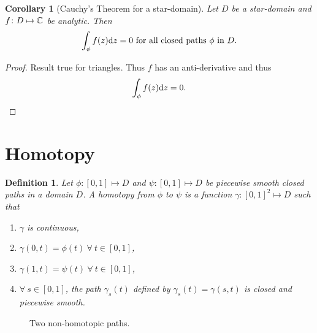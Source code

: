 \documentclass{notes}
\theoremstyle{plain}
\newtheorem{corollary}[proposition]{Corollary}
\newtheorem{definition}[proposition]{Definition}
\begin{document}
\begin{corollary}[Cauchy's Theorem for a star-domain]%
Let $D$ be a star-domain and $f \colon D \mapsto \mathbb{C}$ be analytic.  Then
\[
\int_\phi f(z) \mathrm{d} z = 0 \text{ for all closed paths $\phi$ in $D$.}
\]
\end{corollary}

\begin{proof}
Result true for triangles.  Thus $f$ has an anti-derivative and thus
\[
\int_\phi f(z) \mathrm{d} z = 0.
\]
\end{proof}

\section{Homotopy}

\begin{definition}
Let $\phi \colon [0,1] \mapsto D$ and $\psi \colon [0,1] \mapsto D$ be piecewise smooth
closed paths in a domain $D$.  A homotopy from $\phi$ to
$\psi$ is a function $\gamma \colon [0,1]^2 \mapsto D$ such that
\begin{enumerate}
\item $\gamma$ is continuous,
\item $\gamma(0,t) = \phi(t)\ \forall\ t \in [0,1]$,
\item $\gamma(1,t) = \psi(t)\ \forall\ t \in [0,1]$,
\item $\forall\ s \in [0,1]$, the path $\gamma_s(t)$ defined by $\gamma_s(t)
= \gamma(s,t)$ is closed and piecewise smooth.
\end{enumerate}
\end{definition}

\begin{figure}[h]
\begin{center}
\end{center}
\caption{Two non-homotopic paths.}
\end{figure}
\end{document}
